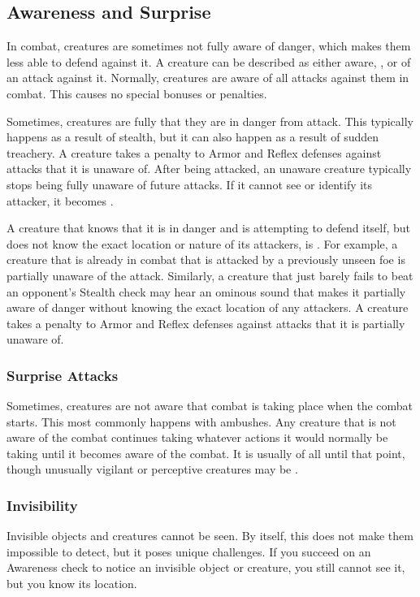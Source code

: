     \subsection{Awareness and Surprise}\label{Awareness and Surprise}
        In combat, creatures are sometimes not fully aware of danger, which makes them less able to defend against it.
        A creature can be described as either aware, \unaware, or \partiallyunaware of an attack against it.
        Normally, creatures are aware of all attacks against them in combat.
        This causes no special bonuses or penalties.

        Sometimes, creatures are fully \unaware that they are in danger from attack.
        This typically happens as a result of stealth, but it can also happen as a result of sudden treachery.
        A creature takes a  penalty to Armor and Reflex defenses against attacks that it is unaware of.
        After being attacked, an unaware creature typically stops being fully unaware of future attacks.
        If it cannot see or identify its attacker, it becomes \partiallyunaware.

        A creature that knows that it is in danger and is attempting to defend itself, but does not know the exact location or nature of its attackers, is \partiallyunaware.
        For example, a creature that is already in combat that is attacked by a previously unseen foe is partially unaware of the attack.
        Similarly, a creature that just barely fails to beat an opponent's Stealth check may hear an ominous sound that makes it partially aware of danger without knowing the exact location of any attackers.
        A creature takes a  penalty to Armor and Reflex defenses against attacks that it is partially unaware of.

        \subsubsection{Surprise Attacks}\label{Surprise Attacks}
            Sometimes, creatures are not aware that combat is taking place when the combat starts.
            This most commonly happens with ambushes.
            Any creature that is not aware of the combat continues taking whatever actions it would normally be taking until it becomes aware of the combat.
            It is usually \unaware of all until that point, though unusually vigilant or perceptive creatures may be \partiallyunaware.

        \subsubsection{Invisibility}\label{Invisibility}
            Invisible objects and creatures cannot be seen.
            By itself, this does not make them impossible to detect, but it poses unique challenges.
            If you succeed on an Awareness check to notice an invisible object or creature, you still cannot see it, but you know its location.

